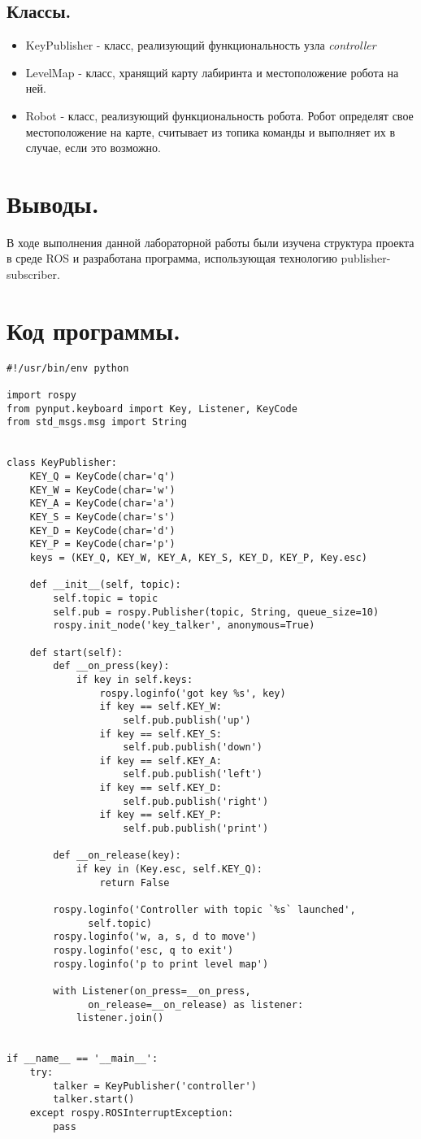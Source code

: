 \documentclass[14pt, a4paper]{extarticle}
\begin{document}
	\subsection{Классы.}
	\begin{itemize}
		\item KeyPublisher - класс, реализующий функциональность узла \textit{controller}
		\item LevelMap - класс, хранящий карту лабиринта и местоположение робота на ней.
		\item Robot - класс, реализующий функциональность робота. Робот определят свое местоположение на карте, считывает из топика команды и выполняет их в случае, если это возможно.
	\end{itemize}

	\section{Выводы.}
	В ходе выполнения данной лабораторной работы были изучена структура проекта в среде ROS и разработана программа, использующая технологию publisher-subscriber.
	
	\section{Код программы.}
	\begin{lstlisting}
#!/usr/bin/env python

import rospy
from pynput.keyboard import Key, Listener, KeyCode
from std_msgs.msg import String


class KeyPublisher:
	KEY_Q = KeyCode(char='q')
	KEY_W = KeyCode(char='w')
	KEY_A = KeyCode(char='a')
	KEY_S = KeyCode(char='s')
	KEY_D = KeyCode(char='d')
	KEY_P = KeyCode(char='p')
	keys = (KEY_Q, KEY_W, KEY_A, KEY_S, KEY_D, KEY_P, Key.esc)

	def __init__(self, topic):
		self.topic = topic
		self.pub = rospy.Publisher(topic, String, queue_size=10)
		rospy.init_node('key_talker', anonymous=True)

	def start(self):
		def __on_press(key):
			if key in self.keys:
				rospy.loginfo('got key %s', key)
				if key == self.KEY_W:
					self.pub.publish('up')
				if key == self.KEY_S:
					self.pub.publish('down')
				if key == self.KEY_A:
					self.pub.publish('left')
				if key == self.KEY_D:
					self.pub.publish('right')
				if key == self.KEY_P:
					self.pub.publish('print')

		def __on_release(key):
			if key in (Key.esc, self.KEY_Q):
				return False

		rospy.loginfo('Controller with topic `%s` launched',
			  self.topic)
		rospy.loginfo('w, a, s, d to move')
		rospy.loginfo('esc, q to exit')
		rospy.loginfo('p to print level map')

		with Listener(on_press=__on_press,
			  on_release=__on_release) as listener:
			listener.join()


if __name__ == '__main__':
	try:
		talker = KeyPublisher('controller')
		talker.start()
	except rospy.ROSInterruptException:
		pass
	\end{lstlisting}
	
\end{document}
